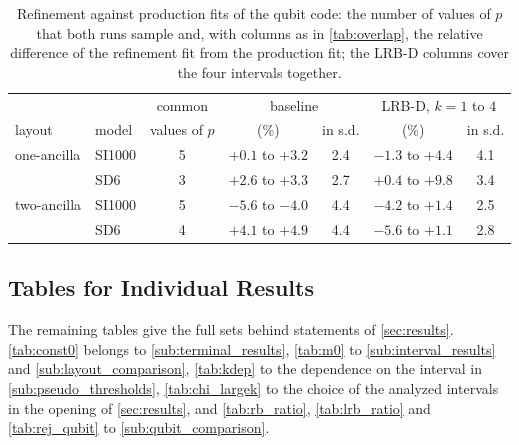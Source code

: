 \begin{table}[tp]
  \centering
  \small
  \begin{tabular}{ll|c|cc|cc}
    \hline
    & & common & \multicolumn{2}{c|}{baseline} & \multicolumn{2}{c}{LRB-D, $k = 1$ to $4$} \\
    layout & model & values of $p$ & (\%) & in s.d. & (\%) & in s.d. \\
    \hline
    one-ancilla & SI1000 & 5 & $+0.1$ to $+3.2$ & 2.4 & $-1.3$ to $+4.4$ & 4.1 \\
     & SD6 & 3 & $+2.6$ to $+3.3$ & 2.7 & $+0.4$ to $+9.8$ & 3.4 \\
    two-ancilla & SI1000 & 5 & $-5.6$ to $-4.0$ & 4.4 & $-4.2$ to $+1.4$ & 2.5 \\
     & SD6 & 4 & $+4.1$ to $+4.9$ & 4.4 & $-5.6$ to $+1.1$ & 2.8 \\
    \hline
  \end{tabular}
  \caption{Refinement against production fits of the qubit code: the number of values of $p$ that both runs sample and, with columns as in \autoref{tab:overlap}, the relative difference of the refinement fit from the production fit; the LRB-D columns cover the four intervals together.}
  \label{tab:overlap_qubit}
\end{table}

\subsection{Tables for Individual Results}
\label{app:campaign-data}

The remaining tables give the full sets behind statements of \autoref{sec:results}. \autoref{tab:const0} belongs to \autoref{sub:terminal_results}, \autoref{tab:m0} to \autoref{sub:interval_results} and \autoref{sub:layout_comparison}, \autoref{tab:kdep} to the dependence on the interval in \autoref{sub:pseudo_thresholds}, \autoref{tab:chi_largek} to the choice of the analyzed intervals in the opening of \autoref{sec:results}, and \autoref{tab:rb_ratio}, \autoref{tab:lrb_ratio} and \autoref{tab:rej_qubit} to \autoref{sub:qubit_comparison}.

